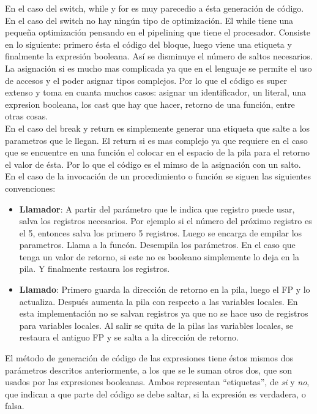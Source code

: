 \documentclass[11pt, spanish]{report}
\begin{document}
En el caso del switch, while y for es muy parecedio a \'esta generaci\'on de c\'odigo. En el caso del switch no hay ning\'un tipo de optimizaci\'on.
El while tiene una peque\~na optimizaci\'on pensando en el pipelining que tiene el procesador. Consiste en lo siguiente: primero \'esta el c\'odigo
del bloque, luego viene una etiqueta y finalmente la expresi\'on booleana. As\'i se disminuye el n\'umero de saltos necesarios.\\

La asignaci\'on si es mucho mas complicada ya que en el lenguaje se permite el uso de accesos y el poder asignar tipos complejos. Por lo que el c\'odigo
es super extenso y toma en cuanta muchos casos: asignar un identificador, un literal, una expresion booleana, los cast que hay que hacer, retorno de una funci\'on, entre otras cosas.\\

En el caso del break y return es simplemente generar una etiqueta que salte a los parametros que le llegan. El return si es mas complejo ya que requiere en el caso que se encuentre en una funci\'on el colocar en el espacio de la pila para el retorno el valor de \'esta. Por lo que el c\'odigo 
es el mimso de la asignaci\'on con un salto.\\

En el caso de la invocaci\'on de un procedimiento o funci\'on se siguen las siguientes convenciones:

  \begin{itemize}
  \item \textbf{Llamador}: A partir del par\'ametro que le indica que registro puede usar, salva los registros necesarios. Por ejemplo si el n\'umero
  del pr\'oximo registro es el 5, entonces salva los primero 5 registros. Luego se encarga de empilar los parametros. Llama a la func\'on. Desempila
  los par\'ametros. En el caso que tenga un valor de retorno, si este no es booleano simplemente lo deja en la pila. Y finalmente restaura los registros.
  \item \textbf{Llamado}: Primero guarda la direcci\'on de retorno en la pila, luego el FP y lo actualiza. Despu\'es aumenta la pila con respecto a las variables locales. En esta implementaci\'on no se salvan registros ya que no se hace uso de registros para variables locales. Al salir se quita de la pilas las variables locales, se restaura el antiguo FP y se salta a la direcci\'on de retorno.
  \end{itemize}

El m\'etodo de generaci\'on de c\'odigo de las expresiones tiene \'estos mismos dos par\'ametros descritos anteriormente, a los que se le suman otros dos, que son usados 
por las expresiones booleanas. Ambos representan ``etiquetas'', de \emph{si} y \emph{no}, que indican a que parte del c\'odigo se debe saltar, si la expresi\'on es verdadera,
o falsa.\\
\end{document}
